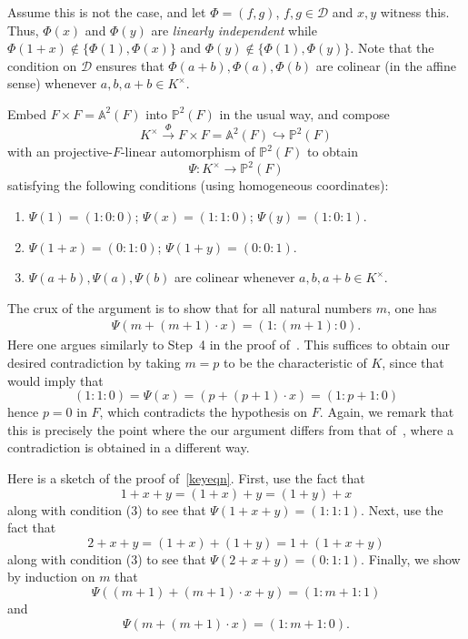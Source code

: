 \documentclass[12pt]{amsart}
\newcommand{\Dcal}{\mathcal{D}}
\newcommand{\Pbb}{\mathbb{P}}
\newcommand{\Abb}{\mathbb{A}}
\begin{document}
Assume this is not the case, and let $\Phi = (f,g)$, $f,g \in \Dcal$ and $x,y$ witness this.
Thus, $\Phi(x)$ and $\Phi(y)$ are \emph{linearly independent} while $\Phi(1+x) \notin \{\Phi(1),\Phi(x)\}$ and $\Phi(y) \notin \{\Phi(1),\Phi(y)\}$.
Note that the condition on $\Dcal$ ensures that $\Phi(a+b),\Phi(a),\Phi(b)$ are colinear (in the affine sense) whenever $a,b,a+b \in K^{\times}$.

Embed $F \times F = \Abb^{2}(F)$ into $\Pbb^{2}(F)$ in the usual way, and compose
\[ K^{\times} \xrightarrow{\Phi} F\times F = \Abb^{2}(F) \hookrightarrow \Pbb^{2}(F) \]
with an projective-$F$-linear automorphism of $\Pbb^{2}(F)$ to obtain
\[ \Psi : K^{\times} \to \Pbb^{2}(F) \]
satisfying the following conditions (using homogeneous coordinates):
\begin{enumerate}
  \item $\Psi(1) = (1:0:0)$; $\Psi(x) = (1:1:0)$; $\Psi(y) = (1:0:1)$.
  \item $\Psi(1+x) = (0:1:0)$; $\Psi(1+y) = (0:0:1)$.
  \item $\Psi(a+b),\Psi(a),\Psi(b)$ are colinear whenever $a,b,a+b \in K^{\times}$.
\end{enumerate}
The crux of the argument is to show that for all natural numbers $m$, one has
\begin{align}\label{keyeqn}
\Psi(m + (m+1) \cdot x) = (1:(m+1):0).
\end{align}
Here one argues similarly to Step~4 in the proof of~\cite[Theorem A.3]{https://doi.org/10.48550/arxiv.1705.01084}.
This suffices to obtain our desired contradiction by taking $m = p$ to be the characteristic of $K$, since that would imply that
\[ (1:1:0) = \Psi(x) = (p + (p+1) \cdot x) = (1:p+1:0) \]
hence $p = 0$ in $F$, which contradicts the hypothesis on $F$.
Again, we remark that this is precisely the point where the our argument differs from that of~\cite[Theorem A.3]{https://doi.org/10.48550/arxiv.1705.01084}, where a contradiction is obtained in a different way.

Here is a sketch of the proof of~\eqref{keyeqn}.
First, use the fact that
\[ 1+x+y = (1+x) + y = (1+y) + x \]
along with condition (3) to see that $\Psi(1+x+y) = (1:1:1)$.
Next, use the fact that
\[ 2+x+y = (1+x) + (1+y) = 1+(1+x+y) \]
along with condition (3) to see that $\Psi(2+x+y) = (0:1:1)$.
Finally, we show by induction on $m$ that
\[ \Psi((m+1)+(m+1) \cdot x + y) = (1:m+1:1) \]
and
\[ \Psi(m+(m+1) \cdot x) = (1:m+1:0). \]
\end{document}
